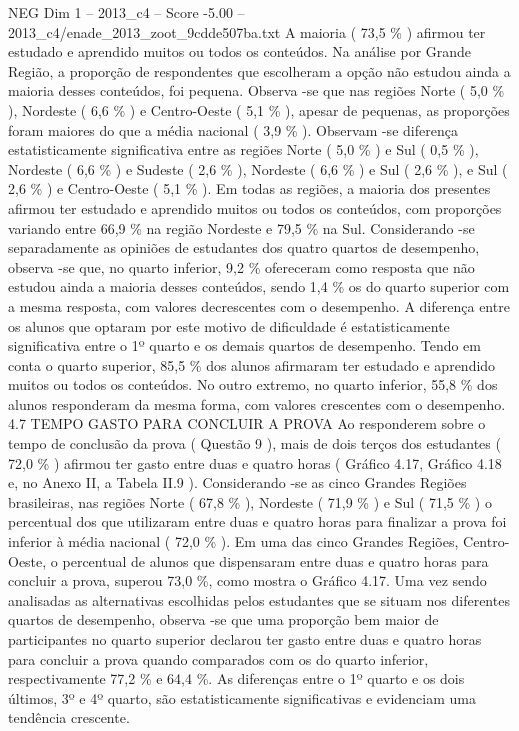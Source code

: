 \begin{textsample}{NEG Dim 1 – 2013\_c4 – Score -5.00 – 2013\_c4/enade\_2013\_zoot\_9cdde507ba.txt}
A maioria ( 73,5 \% ) afirmou ter estudado e aprendido muitos ou todos os conteúdos.
Na análise por Grande Região, a proporção de respondentes que escolheram a opção não estudou ainda a maioria desses conteúdos, foi pequena.
Observa -se que nas regiões Norte ( 5,0 \% ), Nordeste ( 6,6 \% ) e Centro-Oeste ( 5,1 \% ), apesar de pequenas, as proporções foram maiores do que a média nacional ( 3,9 \% ).
Observam -se diferença estatisticamente significativa entre as regiões Norte ( 5,0 \% ) e Sul ( 0,5 \% ), Nordeste ( 6,6 \% ) e Sudeste ( 2,6 \% ), Nordeste ( 6,6 \% ) e Sul ( 2,6 \% ), e Sul ( 2,6 \% ) e Centro-Oeste ( 5,1 \% ).
Em todas as regiões, a maioria dos presentes afirmou ter estudado e aprendido muitos ou todos os conteúdos, com proporções variando entre 66,9 \% na região Nordeste e 79,5 \% na Sul.
Considerando -se separadamente as opiniões de estudantes dos quatro quartos de desempenho, observa -se que, no quarto inferior, 9,2 \% ofereceram como resposta que não estudou ainda a maioria desses conteúdos, sendo 1,4 \% os do quarto superior com a mesma resposta, com valores decrescentes com o desempenho.
A diferença entre os alunos que optaram por este motivo de dificuldade é estatisticamente significativa entre o 1º quarto e os demais quartos de desempenho.
Tendo em conta o quarto superior, 85,5 \% dos alunos afirmaram ter estudado e aprendido muitos ou todos os conteúdos.
No outro extremo, no quarto inferior, 55,8 \% dos alunos responderam da mesma forma, com valores crescentes com o desempenho. 4.7 TEMPO GASTO PARA CONCLUIR A PROVA Ao responderem sobre o tempo de conclusão da prova ( Questão 9 ), mais de dois terços dos estudantes ( 72,0 \% ) afirmou ter gasto entre duas e quatro horas ( Gráfico 4.17, Gráfico 4.18 e, no Anexo II, a Tabela II.9 ).
Considerando -se as cinco Grandes Regiões brasileiras, nas regiões Norte ( 67,8 \% ), Nordeste ( 71,9 \% ) e Sul ( 71,5 \% ) o percentual dos que utilizaram entre duas e quatro horas para finalizar a prova foi inferior à média nacional ( 72,0 \% ).
Em uma das cinco Grandes Regiões, Centro-Oeste, o percentual de alunos que dispensaram entre duas e quatro horas para concluir a prova, superou 73,0 \%, como mostra o Gráfico 4.17.
Uma vez sendo analisadas as alternativas escolhidas pelos estudantes que se situam nos diferentes quartos de desempenho, observa -se que uma proporção bem maior de participantes no quarto superior declarou ter gasto entre duas e quatro horas para concluir a prova quando comparados com os do quarto inferior, respectivamente 77,2 \% e 64,4 \%.
As diferenças entre o 1º quarto e os dois últimos, 3º e 4º quarto, são estatisticamente significativas e evidenciam uma tendência crescente.

\end{textsample}
